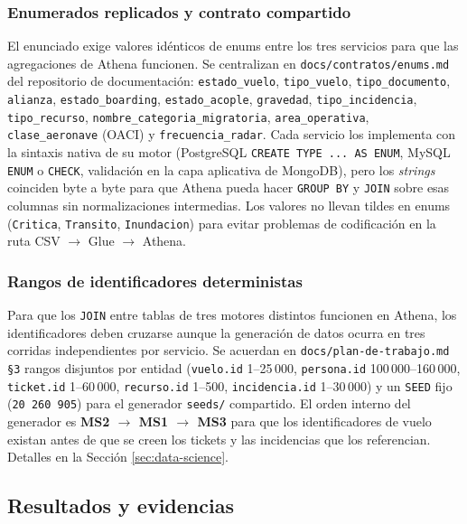 \subsubsection{Enumerados replicados y contrato compartido}
El enunciado exige valores idénticos de enums entre los tres servicios
para que las agregaciones de Athena funcionen. Se centralizan en
\texttt{docs/contratos/enums.md} del repositorio de documentación:
\texttt{estado\_vuelo}, \texttt{tipo\_vuelo}, \texttt{tipo\_documento},
\texttt{alianza}, \texttt{estado\_boarding}, \texttt{estado\_acople},
\texttt{gravedad}, \texttt{tipo\_incidencia}, \texttt{tipo\_recurso},
\texttt{nombre\_categoria\_migratoria}, \texttt{area\_operativa},
\texttt{clase\_aeronave} (OACI) y \texttt{frecuencia\_radar}. Cada servicio
los implementa con la sintaxis nativa de su motor (PostgreSQL
\texttt{CREATE TYPE ... AS ENUM}, MySQL \texttt{ENUM} o \texttt{CHECK},
validación en la capa aplicativa de MongoDB), pero los \emph{strings}
coinciden byte a byte para que Athena pueda hacer \texttt{GROUP BY} y
\texttt{JOIN} sobre esas columnas sin normalizaciones intermedias. Los
valores no llevan tildes en enums (\texttt{Critica}, \texttt{Transito},
\texttt{Inundacion}) para evitar problemas de codificación en la ruta
CSV $\to$ Glue $\to$ Athena.

\subsubsection{Rangos de identificadores deterministas}
Para que los \texttt{JOIN} entre tablas de tres motores distintos
funcionen en Athena, los identificadores deben cruzarse aunque la
generación de datos ocurra en tres corridas independientes por servicio.
Se acuerdan en \texttt{docs/plan-de-trabajo.md \S3} rangos disjuntos por
entidad (\texttt{vuelo.id} 1--25\,000, \texttt{persona.id} 100\,000--160\,000,
\texttt{ticket.id} 1--60\,000, \texttt{recurso.id} 1--500,
\texttt{incidencia.id} 1--30\,000) y un \texttt{SEED} fijo
(\texttt{20\,260\,905}) para el generador \texttt{seeds/} compartido. El
orden interno del generador es \textbf{MS2 $\to$ MS1 $\to$ MS3} para que
los identificadores de vuelo existan antes de que se creen los tickets y
las incidencias que los referencian. Detalles en la Sección
\ref{sec:data-science}.

\subsection{Resultados y evidencias}

